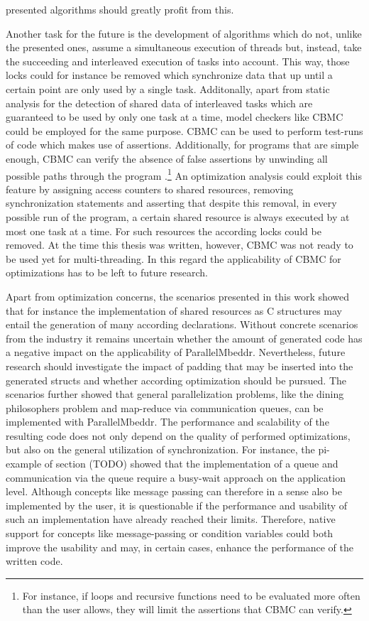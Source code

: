 presented algorithms should greatly profit from this.

Another task for the future is the development of algorithms which do not, unlike the presented ones, assume a simultaneous execution of threads but, instead, take the succeeding and interleaved execution of tasks into account. This way, those locks could for instance be removed which synchronize data that up until a certain point are only used by a single task. Additonally, apart from static analysis for the detection of shared data of interleaved tasks which are guaranteed to be used by only one task at a time, model checkers like CBMC could be employed for the same purpose. CBMC can be used to perform test-runs of code which makes use of assertions. Additionally, for programs that are simple enough, CBMC can verify the absence of false assertions by unwinding all possible paths through the program \cite{CBMCTutorial}.\footnote{For instance, if loops and recursive functions need to be evaluated more often than the user allows, they will limit the assertions that CBMC can verify.} An optimization analysis could exploit this feature by assigning access counters to shared resources, removing synchronization statements and asserting that despite this removal, in every possible run of the program, a certain shared resource is always executed by at most one task at a time. For such resources the according locks could be removed. At the time this thesis was written, however, CBMC was not ready to be used yet for multi-threading. In this regard the applicability of CBMC for optimizations has to be left to future research.

Apart from optimization concerns, the scenarios presented in this work showed that for instance the implementation of shared resources as C structures may entail the generation of many according declarations. Without concrete scenarios from the industry it remains uncertain whether the amount of generated code has a negative impact on the applicability of ParallelMbeddr. Nevertheless, future research should investigate the impact of padding that may be inserted into the generated structs and whether according optimization should be pursued. The scenarios further showed that general parallelization problems, like the dining philosophers problem and map-reduce via communication queues, can be implemented with ParallelMbeddr. The performance and scalability of the resulting code does not only depend on the quality of performed optimizations, but also on the general utilization of synchronization. For instance, the pi-example of section (TODO) showed that the implementation of a queue and communication via the queue require a busy-wait approach on the application level. Although concepts like message passing can therefore in a sense also be implemented by the user, it is questionable if the performance and usability of such an implementation have already reached their limits. Therefore, native support for concepts like message-passing or condition variables could both improve the usability and may, in certain cases, enhance the performance of the written code.

